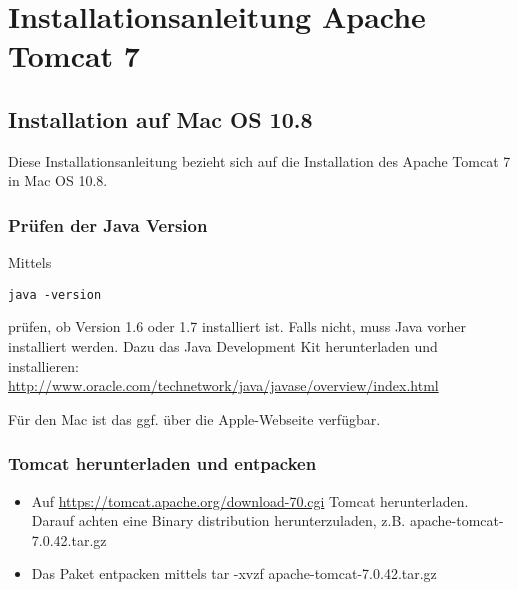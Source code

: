 \chapter{Installationsanleitung Apache Tomcat 7}\label{kap:anhangtomcat}

\section{Installation auf Mac OS 10.8}

Diese Installationsanleitung bezieht sich auf die Installation des Apache Tomcat 7 in Mac OS 10.8. 

\subsection{Prüfen der Java Version}

Mittels 

\lstinline[basicstyle=\ttfamily\small\mdseries]{java -version}

prüfen, ob Version 1.6 oder 1.7 installiert ist. Falls nicht, muss Java vorher installiert werden. Dazu das Java Development Kit herunterladen und installieren: \href{http://www.oracle.com/technetwork/java/javase/overview/index.html}{http://www.oracle.com/technetwork/java/javase/overview/index.html}

Für den Mac ist das ggf. über die Apple-Webseite verfügbar. 

\subsection{Tomcat herunterladen und entpacken}

\begin{itemize}
\item Auf \href{https://tomcat.apache.org/download-70.cgi}{https://tomcat.apache.org/download-70.cgi} Tomcat herunterladen. Darauf achten eine Binary distribution herunterzuladen, z.B. apache-tomcat-7.0.42.tar.gz
\item Das Paket entpacken mittels tar -xvzf apache-tomcat-7.0.42.tar.gz
\end{itemize}

